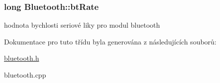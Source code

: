 \subsubsection[{\texorpdfstring{bt\+Rate}{btRate}}]{\setlength{\rightskip}{0pt plus 5cm}long Bluetooth\+::bt\+Rate\hspace{0.3cm}{\ttfamily [private]}}\hypertarget{class_bluetooth_a4c50a5cea29bb234f37aba4c8632d0b2}{}\label{class_bluetooth_a4c50a5cea29bb234f37aba4c8632d0b2}
hodnota bychlosti seriové liky pro modul bluetooth 

Dokumentace pro tuto třídu byla generována z následujících souborů\+:\begin{DoxyCompactItemize}
\item 
\hyperlink{bluetooth_8h}{bluetooth.\+h}\item 
bluetooth.\+cpp\end{DoxyCompactItemize}
